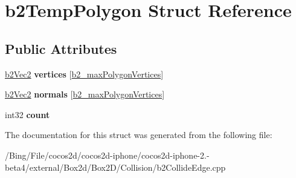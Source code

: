 \hypertarget{structb2_temp_polygon}{\section{b2\-Temp\-Polygon Struct Reference}
\label{structb2_temp_polygon}
}
\subsection*{Public Attributes}
\begin{DoxyCompactItemize}
\item 
\hypertarget{structb2_temp_polygon_a7351a98f6052d1fce66e11bfc5b98a3a}{\hyperlink{structb2_vec2}{b2\-Vec2} {\bfseries vertices} \mbox{[}\hyperlink{b2_settings_8h_a09d71ee1993bee28b5b2e6d893b41884}{b2\-\_\-max\-Polygon\-Vertices}\mbox{]}}\label{structb2_temp_polygon_a7351a98f6052d1fce66e11bfc5b98a3a}

\item 
\hypertarget{structb2_temp_polygon_a45b9db5dcbcb66170029e9a2f524fc6a}{\hyperlink{structb2_vec2}{b2\-Vec2} {\bfseries normals} \mbox{[}\hyperlink{b2_settings_8h_a09d71ee1993bee28b5b2e6d893b41884}{b2\-\_\-max\-Polygon\-Vertices}\mbox{]}}\label{structb2_temp_polygon_a45b9db5dcbcb66170029e9a2f524fc6a}

\item 
\hypertarget{structb2_temp_polygon_a5b08379f676f8498190c398d9ec3d0a5}{int32 {\bfseries count}}\label{structb2_temp_polygon_a5b08379f676f8498190c398d9ec3d0a5}

\end{DoxyCompactItemize}


The documentation for this struct was generated from the following file\-:\begin{DoxyCompactItemize}
\item 
/\-Bing/\-File/cocos2d/cocos2d-\/iphone/cocos2d-\/iphone-\/2.-\/beta4/external/\-Box2d/\-Box2\-D/\-Collision/b2\-Collide\-Edge.\-cpp\end{DoxyCompactItemize}
